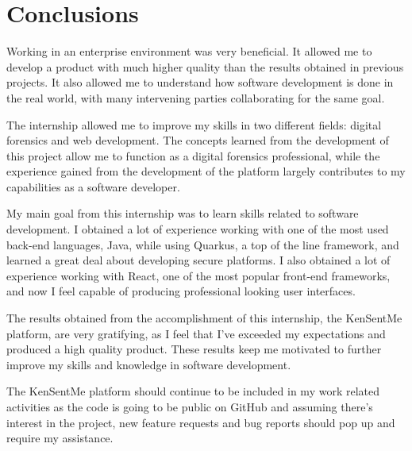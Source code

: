 

\chapter{Conclusions}
\label{ch:conclusion}

Working in an enterprise environment was very beneficial.
It allowed me to develop a product with much higher quality than the results obtained in previous projects.
It also allowed me to understand how software development is done in the real world, with many intervening parties collaborating for the same goal.

The internship allowed me to improve my skills in two different fields: digital forensics and web development.
The concepts learned from the development of this project allow me to function as a digital forensics professional, 
while the experience gained from the development of the platform largely contributes to my capabilities as a software developer.

My main goal from this internship was to learn skills related to software development.
I obtained a lot of experience working with one of the most used back-end languages, Java, while using Quarkus, a top of the line framework,
and learned a great deal about developing secure platforms.
I also obtained a lot of experience working with React, one of the most popular front-end frameworks, and now I feel capable of producing professional looking user interfaces.

The results obtained from the accomplishment of this internship, the KenSentMe platform, are very gratifying, as I feel that I've exceeded my expectations and produced a high quality product.
These results keep me motivated to further improve my skills and knowledge in software development.

The KenSentMe platform should continue to be included in my work related activities as the code is going to be public on GitHub 
and assuming there's interest in the project, new feature requests and bug reports should pop up and require my assistance.
